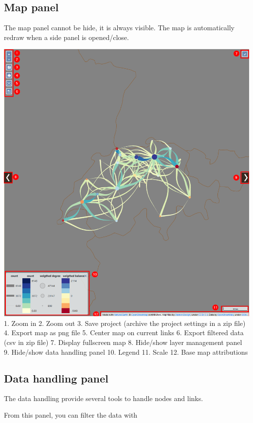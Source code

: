 \documentclass[]{book}
\begin{document}
\hypertarget{map-panel}{%
\subsection{Map panel}\label{map-panel}}

The map panel cannot be hide, it is always visible.
The map is automatically redraw when a side panel is opened/close.

\includegraphics{images/functions/map_panel/functions_map_panel_general_view.png}
1. Zoom in
2. Zoom out
3. Save project (archive the project settings in a zip file)
4. Export map as png file
5. Center map on current links
6. Export filtered data (csv in zip file)
7. Display fullscreen map
8. Hide/show layer management panel
9. Hide/show data handling panel
10. Legend
11. Scale
12. Base map attributions

\hypertarget{data-handling-panel}{%
\subsection{Data handling panel}\label{data-handling-panel}}

The data handling provide several tools to handle nodes and links.

From this panel, you can filter the data with
\end{document}
